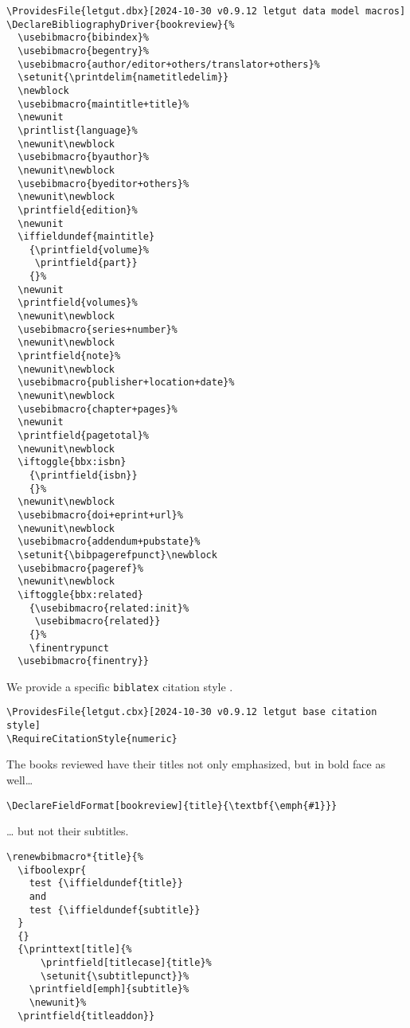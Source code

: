 \documentclass{letgut}
\begin{document}
\begin{lstlisting}
\ProvidesFile{letgut.dbx}[2024-10-30 v0.9.12 letgut data model macros]
\DeclareBibliographyDriver{bookreview}{%
  \usebibmacro{bibindex}%
  \usebibmacro{begentry}%
  \usebibmacro{author/editor+others/translator+others}%
  \setunit{\printdelim{nametitledelim}}
  \newblock
  \usebibmacro{maintitle+title}%
  \newunit
  \printlist{language}%
  \newunit\newblock
  \usebibmacro{byauthor}%
  \newunit\newblock
  \usebibmacro{byeditor+others}%
  \newunit\newblock
  \printfield{edition}%
  \newunit
  \iffieldundef{maintitle}
    {\printfield{volume}%
     \printfield{part}}
    {}%
  \newunit
  \printfield{volumes}%
  \newunit\newblock
  \usebibmacro{series+number}%
  \newunit\newblock
  \printfield{note}%
  \newunit\newblock
  \usebibmacro{publisher+location+date}%
  \newunit\newblock
  \usebibmacro{chapter+pages}%
  \newunit
  \printfield{pagetotal}%
  \newunit\newblock
  \iftoggle{bbx:isbn}
    {\printfield{isbn}}
    {}%
  \newunit\newblock
  \usebibmacro{doi+eprint+url}%
  \newunit\newblock
  \usebibmacro{addendum+pubstate}%
  \setunit{\bibpagerefpunct}\newblock
  \usebibmacro{pageref}%
  \newunit\newblock
  \iftoggle{bbx:related}
    {\usebibmacro{related:init}%
     \usebibmacro{related}}
    {}%
    \finentrypunct
  \usebibmacro{finentry}}
\end{lstlisting}

We provide a specific \lstinline+biblatex+ citation style .

\begin{lstlisting}
\ProvidesFile{letgut.cbx}[2024-10-30 v0.9.12 letgut base citation style]
\RequireCitationStyle{numeric}
\end{lstlisting}

The books reviewed have their titles not only emphasized, but in bold face as
well\ldots{}

\begin{lstlisting}
\DeclareFieldFormat[bookreview]{title}{\textbf{\emph{#1}}}
\end{lstlisting}

\ldots{} but not their subtitles.

\begin{lstlisting}
\renewbibmacro*{title}{%
  \ifboolexpr{
    test {\iffieldundef{title}}
    and
    test {\iffieldundef{subtitle}}
  }
  {}
  {\printtext[title]{%
      \printfield[titlecase]{title}%
      \setunit{\subtitlepunct}}%
    \printfield[emph]{subtitle}%
    \newunit}%
  \printfield{titleaddon}}
\end{lstlisting}
\end{document}
